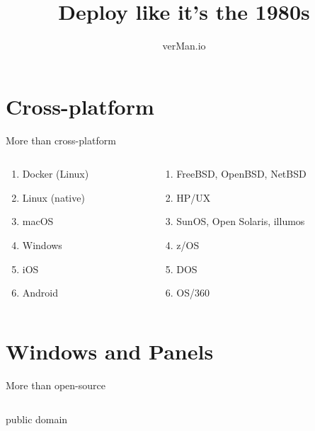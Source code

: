 \documentclass[aspectratio=169]{beamer}
\title{Deploy like it's the 1980s}
\author{verMan.io}
\date{}%
\begin{document}
\begin{frame}
  \titlepage
\end{frame}

\section{Cross-platform}

\begin{frame}{More than cross-platform}
    \begin{columns}
        \begin{column}{0.5\textwidth}
           \begin{enumerate}[<+->]
                \item[0.] Docker (Linux)
                \item Linux (native)
                \item macOS
                \item Windows
                \item iOS
                \item Android
           \end{enumerate}
        \end{column}
        \begin{column}{0.5\textwidth}  %
            \begin{enumerate}[<+->]
                \item[4.] FreeBSD, OpenBSD, NetBSD
                \item[5.] HP/UX
                \item[6.] SunOS, Open Solaris, illumos
                \item[7.] z/OS
                \item[8.] DOS
                \item[9.] OS/360
            \end{enumerate}
        \end{column}
    \end{columns}
\end{frame}

\section{Windows and Panels}

\begin{frame}{More than open-source}
    \begin{columns}
        \begin{column}{0.5\textwidth}
  \begin{tvWindow}[License]
    \begin{center}
    public domain
    \end{center}
  \end{tvWindow}
\end{column}
\end{columns}
\end{frame}
\end{document}
